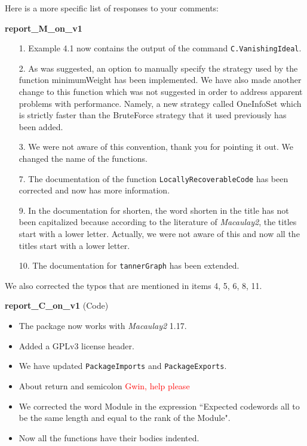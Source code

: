 \documentclass[12pt]{amsart}
\theoremstyle{plain}
\begin{document}
Here is a more specific list of responses to your comments:
\begin{center}
{\bf report\_M\_on\_v1}
\end{center}
\begin{itemize}
\item[\rm 1.] Example 4.1 now contains the output of the command {\tt C.VanishingIdeal}.
\item[\rm 2.] As was suggested, an option to manually specify the strategy used by the function {\ttfamily minimumWeight} has been implemented. We have also made another change to this function which was not suggested in order to address apparent problems with performance. Namely, a new strategy called {\ttfamily OneInfoSet} which is strictly faster than the {\ttfamily BruteForce} strategy that it used previously has been added.
\item[\rm 3.] We were not aware of this convention, thank you for pointing it out. We changed the name of the functions.
\item[\rm 7.] The documentation of the function {\tt LocallyRecoverableCode} has been corrected and now has more information.
\item[\rm 9.] In the documentation for shorten, the word shorten in the title has not been capitalized because according to the literature of {\it Macaulay2}, the titles start with a lower letter. Actually, we were not aware of this and now all the titles start with a lower letter.
\item[\rm 10.] The documentation for {\tt tannerGraph} has been extended.
\end{itemize}
We also corrected the typos that are mentioned in items 4, 5, 6, 8, 11.
\begin{center}
{\bf report\_C\_on\_v1} (Code)
\end{center}
\begin{itemize}
\item The package now works with {\it Macaulay2} 1.17.
\item Added a GPLv3 license header. 
\item We have updated {\tt PackageImports} and {\tt PackageExports}.
\item About return and semicolon \textcolor{red}{Gwin, help please}
\item We corrected the word Module in the expression ``Expected codewords all to be the same length and equal to the rank of the Module".
\item Now all the functions have their bodies indented.
\end{itemize}
\end{document}
